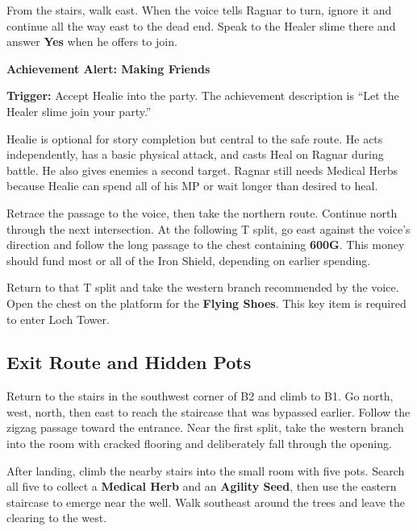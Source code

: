 \documentclass[
  american,
  10pt,
  letterpaper,
  oneside,
  open=any]{scrreprt}
\begin{document}
From the stairs, walk east. When the voice tells Ragnar to turn, ignore
it and continue all the way east to the dead end. Speak to the Healer
slime there and answer \textbf{Yes} when he offers to join.

\begin{achievementalert}

\textbf{Achievement Alert: Making Friends}

\textbf{Trigger:} Accept Healie into the party. The achievement
description is ``Let the Healer slime join your party.''

\end{achievementalert}

Healie is optional for story completion but central to the safe route.
He acts independently, has a basic physical attack, and casts Heal on
Ragnar during battle. He also gives enemies a second target. Ragnar
still needs Medical Herbs because Healie can spend all of his MP or wait
longer than desired to heal.

Retrace the passage to the voice, then take the northern route. Continue
north through the next intersection. At the following T split, go east
against the voice's direction and follow the long passage to the chest
containing \textbf{600G}. This money should fund most or all of the Iron
Shield, depending on earlier spending.

Return to that T split and take the western branch recommended by the
voice. Open the chest on the platform for the \textbf{Flying Shoes}.
This key item is required to enter Loch Tower.

\subsection{Exit Route and Hidden
Pots}\label{exit-route-and-hidden-pots}

Return to the stairs in the southwest corner of B2 and climb to B1. Go
north, west, north, then east to reach the staircase that was bypassed
earlier. Follow the zigzag passage toward the entrance. Near the first
split, take the western branch into the room with cracked flooring and
deliberately fall through the opening.

After landing, climb the nearby stairs into the small room with five
pots. Search all five to collect a \textbf{Medical Herb} and an
\textbf{Agility Seed}, then use the eastern staircase to emerge near the
well. Walk southeast around the trees and leave the clearing to the
west.
\end{document}
